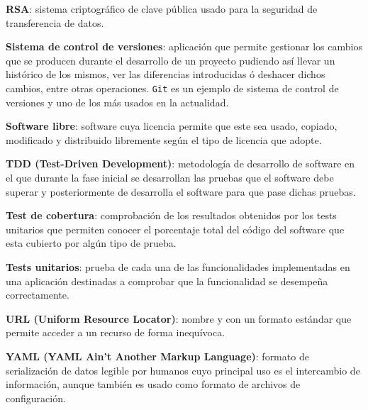 \textbf{RSA}: sistema criptográfico de clave pública usado para la seguridad de transferencia de datos.
\bigskip

\textbf{Sistema de control de versiones}: aplicación que permite gestionar los cambios que se producen durante el desarrollo de un proyecto pudiendo así llevar un histórico de los mismos, ver las diferencias introducidas ó deshacer dichos cambios, entre otras operaciones. {\tt Git} es un ejemplo de sistema de control de versiones y uno de los más usados en la actualidad.
\bigskip

\textbf{Software libre}: software cuya licencia permite que este sea usado, copiado, modificado y distribuido libremente según el tipo de licencia que adopte.
\bigskip

\textbf{TDD (Test-Driven Development)}: metodología de desarrollo de software en el que durante la fase inicial se desarrollan las pruebas que el software debe superar y posteriormente de desarrolla el software para que pase dichas pruebas.
\bigskip

\textbf{Test de cobertura}: comprobación de los resultados obtenidos por los tests unitarios que permiten conocer el porcentaje total del código del software que esta cubierto por algún tipo de prueba.
\bigskip

\textbf{Tests unitarios}: prueba de cada una de las funcionalidades implementadas en una aplicación destinadas a comprobar que la funcionalidad se desempeña correctamente.
\bigskip

\textbf{URL (Uniform Resource Locator)}: nombre y con un formato estándar que permite acceder a un recurso de forma inequívoca.
\bigskip

\textbf{YAML (YAML Ain't Another Markup Language)}: formato de serialización de datos legible por humanos cuyo principal uso es el intercambio de información, aunque también es usado como formato de archivos de configuración.
